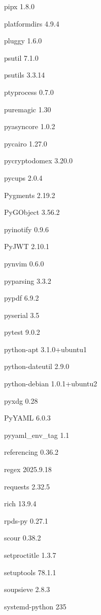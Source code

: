 \documentclass[11pt,a4paper]{article}
\begin{document}
pipx                      1.8.0

platformdirs              4.9.4

pluggy                    1.6.0

psutil                    7.1.0

psutils                   3.3.14

ptyprocess                0.7.0

puremagic                 1.30

pyasyncore                1.0.2

pycairo                   1.27.0

pycryptodomex             3.20.0

pycups                    2.0.4

Pygments                  2.19.2

PyGObject                 3.56.2

pyinotify                 0.9.6

PyJWT                     2.10.1

pynvim                    0.6.0

pyparsing                 3.3.2

pypdf                     6.9.2

pyserial                  3.5

pytest                    9.0.2

python-apt                3.1.0+ubuntu1

python-dateutil           2.9.0

python-debian             1.0.1+ubuntu2

pyxdg                     0.28

PyYAML                    6.0.3

pyyaml\_env\_tag            1.1

referencing               0.36.2

regex                     2025.9.18

requests                  2.32.5

rich                      13.9.4

rpds-py                   0.27.1

scour                     0.38.2

setproctitle              1.3.7

setuptools                78.1.1

soupsieve                 2.8.3

systemd-python            235
\end{document}
